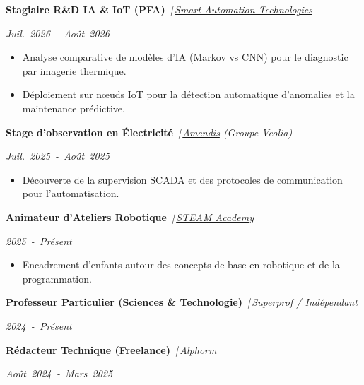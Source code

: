\documentclass[10pt, a4paper]{article}
\newcommand{\experience}[3]{%
    \noindent
    \parbox[t]{0.72\textwidth}{\textbf{#1} \textit{\,|\,#2}}%
    \hfill
    \parbox[t]{0.26\textwidth}{\raggedleft\normalfont\itshape\mbox{#3}}%
    \par\vspace{0.2ex}
}
\begin{document}
\experience{Stagiaire R\&D IA \& IoT (PFA)}{\href{https://www.linkedin.com/company/smart-automation-technologies/home/}{Smart Automation Technologies}}{Juil. 2026 - Août 2026}
\begin{itemize}
	\item Analyse comparative de modèles d'IA (Markov vs CNN) pour le diagnostic par imagerie thermique.
	\item Déploiement sur nœuds IoT pour la détection automatique d'anomalies et la maintenance prédictive.
\end{itemize}

\experience{Stage d'observation en Électricité}{\href{https://www.amendis.ma/}{Amendis} (Groupe Veolia)}{Juil. 2025 - Août 2025}
\begin{itemize}
	\item Découverte de la supervision SCADA et des protocoles de communication pour l'automatisation.
\end{itemize}

\experience{Animateur d'Ateliers Robotique}{\href{https://www.facebook.com/steamacademy.ma/}{STEAM Academy}}{2025 - Présent}
\begin{itemize}
	\item Encadrement d'enfants autour des concepts de base en robotique et de la programmation.
\end{itemize}

\experience{Professeur Particulier (Sciences \& Technologie)}{\href{https://www.superprof.ma/}{Superprof} / Indépendant}{2024 - Présent}

\experience{Rédacteur Technique (Freelance)}{\href{https://www.alphorm.com/}{Alphorm}}{Août 2024 - Mars 2025}





\end{document}
